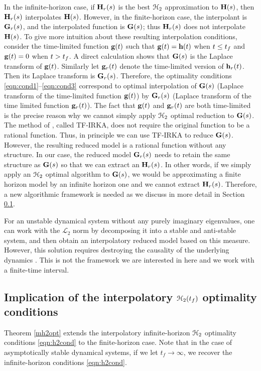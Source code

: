 \documentclass[twocolumn]{autart}
\begin{document}
\begin{remark}
In the infinite-horizon case, if  $\mathbf{H}_r(s)$ is the best $\EuScript{H}_2$ approximation to $\mathbf{H}(s)$, then $\mathbf{H}_r(s)$ interpolates $\mathbf{H}(s)$. However, in the finite-horizon case, 
the interpolant is $\mathbf{G}_r(s)$, and the interpolated function is $\mathbf{G}(s)$; thus $\mathbf{H}_r(s)$ does not interpolate $\mathbf{H}(s)$. To give more intuition about these resulting interpolation conditions, consider the time-limited function $\mathbf{g}(t)$ such that 
$\mathbf{g}(t)=\mathbf{h}(t)$ when   $t\leq {t_f}$ and $\mathbf{g}(t)=0$ when $t > {t_f}$.
A direct calculation shows that $\mathbf{G}(s)$ is the Laplace transform of $\mathbf{g}(t)$. Similarly let $\mathbf{g}_r(t)$ 
denote the time-limited version of $\mathbf{h}_r(t)$. Then its Laplace transform is 
 $\mathbf{G}_r(s)$.  Therefore, the optimality conditions  \eqref{eqn:cond1}--\eqref{eqn:cond3}
 correspond to optimal interpolation of $\mathbf{G}(s)$ (Laplace transform of the time-limited function
 $\mathbf{g}(t)$)
 by $\mathbf{G}_r(s)$ (Laplace transform of the time limited function  $\mathbf{g}_r(t)$). The fact that  
 $\mathbf{g}(t)$ and   $\mathbf{g}_r(t)$ are both time-limited is the precise reason  why we cannot simply apply $\EuScript{H}_2$ optimal reduction  to $\mathbf{G}(s)$. The method of \cite{beattie2012realization}, called TF-IRKA, does not require the original function to be a rational function. Thus, in principle we can use TF-IRKA to reduce $\mathbf{G}(s)$. However, the resulting reduced model is a rational function without any structure. In our case, the reduced model $\mathbf{G}_r(s)$ needs to retain the same structure as $\mathbf{G}(s)$ so that we can extract an $\mathbf{H}_r(s)$. In other words, if we simply apply an $\EuScript{H}_2$ optimal algorithm to $\mathbf{G}(s)$, we would be approximating a finite horizon model by an infinite horizon one and we cannot extract $\mathbf{H}_r(s)$. Therefore, a new  algorithmic framework  is needed as we discuss in more detail in Section \ref{sec:discuss}.
\end{remark}

\begin{remark}
For an unstable dynamical system without any purely imaginary eigenvalues, one can work with the
 $\mathcal{L}_2$ norm by decomposing it into a stable and anti-stable system, and then obtain an interpolatory reduced model based on this measure.  However, this solution requires destroying the causality of the underlying dynamics \cite{magruder2010rational}. This is not the framework we are interested in here and we  work with a finite-time interval. 
 \end{remark}

\subsection{Implication of the interpolatory $\EuScript{H}_2({t_f})$ optimality conditions}
\label{sec:discuss}
Theorem \ref{mh2opt} extends the interpolatory infinite-horizon $\EuScript{H}_2$ optimality conditions \eqref{eqn:h2cond} to the finite-horizon case. Note that in the case of asymptotically stable dynamical systems, if we let $t_f \to \infty$, we recover the infinite-horizon conditions  \eqref{eqn:h2cond}.
\end{document}
